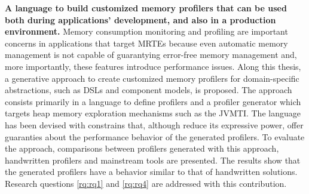 \textbf{A language to build customized memory profilers that can be used both during applications' development, and also in a production environment.}
Memory consumption monitoring and profiling are important concerns in applications that target MRTEs because even automatic memory management is not capable of guarantying error-free memory management and, more importantly, these features introduce performance issues.
Along this thesis, a generative approach to create customized memory profilers for domain-specific abstractions, such as DSLs and component models, is proposed.
The approach consists primarily in a language to define profilers and a profiler generator which targets heap memory exploration mechanisms such as the \gls{JVMTI}.
The language has been devised with constrains that, although reduce its expressive power, offer guaranties about the performance behavior of the generated profilers.
To evaluate the approach, comparisons between profilers generated with this approach, handwritten profilers and mainstream tools are presented.
The results show that the generated profilers have a behavior similar to that of handwritten solutions.
Research questions \ref{rq:rq1} and \ref{rq:rq4} are addressed with this contribution.
